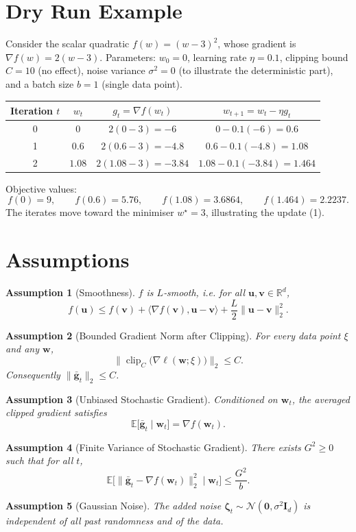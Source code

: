 \documentclass{article}
\newtheorem{assumption}{Assumption}
\begin{document}
\section*{Dry Run Example}
Consider the scalar quadratic $f(w)=(w-3)^2$, whose gradient is $\nabla f(w)=2(w-3)$.  
Parameters: $w_0=0$, learning rate $\eta=0.1$, clipping bound $C=10$ (no effect), noise variance $\sigma^2=0$ (to illustrate the deterministic part), and a batch size $b=1$ (single data point).  

\begin{center}
\begin{tabular}{c|c|c|c}
Iteration $t$ & $w_t$ & $g_t=\nabla f(w_t)$ & $w_{t+1}=w_t-\eta g_t$\\\hline
0 & $0$ & $2(0-3)=-6$ & $0-0.1(-6)=0.6$\\
1 & $0.6$ & $2(0.6-3)=-4.8$ & $0.6-0.1(-4.8)=1.08$\\
2 & $1.08$ & $2(1.08-3)=-3.84$ & $1.08-0.1(-3.84)=1.464$\\
\end{tabular}
\end{center}
Objective values:
\[
f(0)=9,\qquad f(0.6)=5.76,\qquad f(1.08)=3.6864,\qquad f(1.464)=2.2237.
\]
The iterates move toward the minimiser $w^\star=3$, illustrating the update (1).

\newpage
\section*{Assumptions}
\begin{assumption}[Smoothness]\label{ass:smooth}
$f$ is $L$‑smooth, i.e. for all $\mathbf{u},\mathbf{v}\in\mathbb{R}^d$,
\[
f(\mathbf{u})\le f(\mathbf{v})+\langle\nabla f(\mathbf{v}),\mathbf{u}-\mathbf{v}\rangle+\frac{L}{2}\|\mathbf{u}-\mathbf{v}\|_2^{2}.
\]
\end{assumption}
\begin{assumption}[Bounded Gradient Norm after Clipping]\label{ass:clip}
For every data point $\xi$ and any $\mathbf{w}$,
\[
\big\|\operatorname{clip}_C\big(\nabla\ell(\mathbf{w};\xi)\big)\big\|_2\le C.
\]
Consequently $\|\bar{\mathbf{g}}_t\|_2\le C$.
\end{assumption}
\begin{assumption}[Unbiased Stochastic Gradient]\label{ass:unbiased}
Conditioned on $\mathbf{w}_t$, the averaged clipped gradient satisfies
\[
\mathbb{E}\big[\bar{\mathbf{g}}_t\mid\mathbf{w}_t\big]=\nabla f(\mathbf{w}_t).
\]
\end{assumption}
\begin{assumption}[Finite Variance of Stochastic Gradient]\label{ass:variance}
There exists $G^2\ge0$ such that for all $t$,
\[
\mathbb{E}\big[\|\bar{\mathbf{g}}_t-\nabla f(\mathbf{w}_t)\|_2^{2}\mid\mathbf{w}_t\big]\le \frac{G^{2}}{b}.
\]
\end{assumption}
\begin{assumption}[Gaussian Noise]\label{ass:gauss}
The added noise $\bm{\zeta}_t\sim\mathcal{N}(\mathbf{0},\sigma^{2}\mathbf{I}_d)$ is independent of all past randomness and of the data.
\end{assumption}
\end{document}

